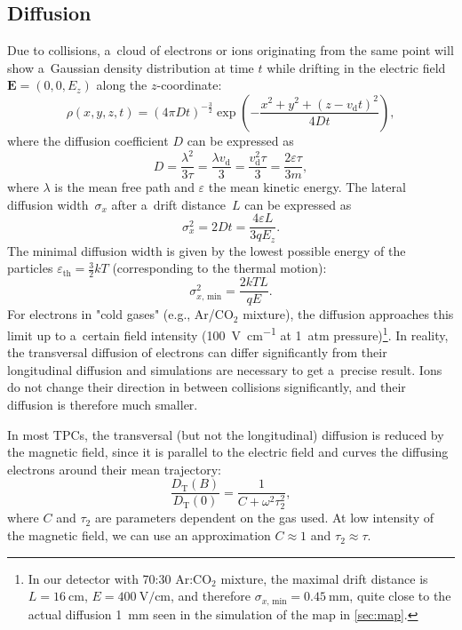 		\subsection{Diffusion}
			Due to collisions, a~cloud of electrons or ions originating from the same point will show a~Gaussian density distribution at time $t$ while drifting in the electric field $\mathbf{E} = (0,0,E_z)$ along the $z$\nobreakdash-coordinate:
				\begin{equation}
					\rho(x,y,z,t) = (4\pi Dt)^{-\frac{3}{2}} \exp\left(-\frac{x^2+y^2+(z-v_\text{d}t)^2}{4Dt}\right),
				\end{equation}
			where the diffusion coefficient $D$ can be expressed as
				\begin{equation}
					D = \frac{\lambda^2}{3\tau} = \frac{\lambda v_\text{d}}{3} = \frac{v_\text{d}^2\tau}{3} = \frac{2\varepsilon\tau}{3m},
				\end{equation}
			where $\lambda$ is the mean free path and $\varepsilon$ the mean kinetic energy. The lateral diffusion width~$\sigma_x$ after a~drift distance~$L$ can be expressed as
				\begin{equation}
					\sigma_x^2 = 2Dt = \frac{4\varepsilon L}{3qE_z}.
				\end{equation}
			The minimal diffusion width is given by the lowest possible energy of the particles $\varepsilon_\text{th} = \frac{3}{2}kT$ (corresponding to the thermal motion):
				\begin{equation}
					\sigma_{x, \,\text{min}}^2 = \frac{2kTL}{qE}.
				\end{equation}
			For electrons in "cold gases" (e.g., Ar/CO$_2$ mixture), the diffusion approaches this limit up to a~certain field intensity (\textapprox\qty{100}{\V\per\cm} at 1~atm pressure)\footnote{In our detector with 70:30 Ar:CO$_2$ mixture, the maximal drift distance is $L=\qty{16}{\cm}$, $E=\qty{400}{\V\per\cm}$, and therefore $\sigma_{x, \,\text{min}} = \qty{0.45}{\mm}$, quite close to the actual diffusion \textapprox\qty{1}{\mm} seen in the simulation of the map in \cref{sec:map}.}. In reality, the transversal diffusion of electrons can differ significantly from their longitudinal diffusion and simulations are necessary to get a~precise result. Ions do not change their direction in between collisions significantly, and their diffusion is therefore much smaller.
			
			In most \acp{TPC}, the transversal (but not the longitudinal) diffusion is reduced by the magnetic field, since it is parallel to the electric field and curves the diffusing electrons around their mean trajectory:
				\begin{equation}
					\label{eq:difmag}
					\frac{D_\text{T}(B)}{D_\text{T}(0)} = \frac{1}{C+\omega^2\tau_2^2},
				\end{equation}
			where $C$ and $\tau_2$ are parameters dependent on the gas used. At low intensity of the magnetic field, we can use an approximation $C\approx1$ and $\tau_2\approx\tau$.
			
